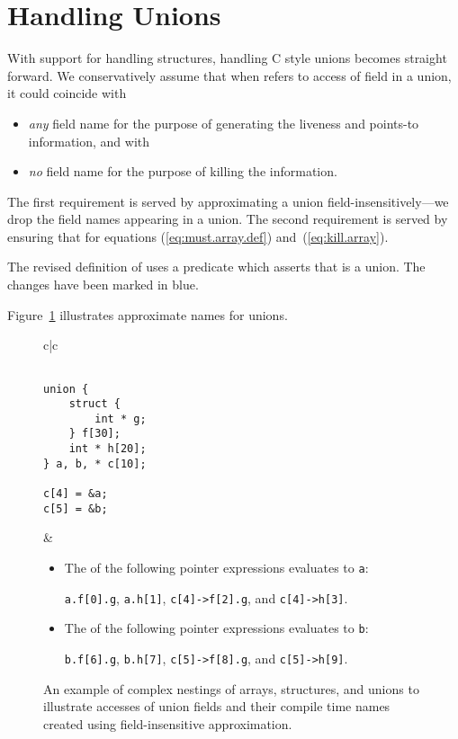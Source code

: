 \documentclass[a4paper,11pt,fleqn]{article}
\begin{document}
\section{Handling Unions}
\label{sec:unions}

With support for handling structures, handling C style unions becomes straight forward.
We conservatively assume that when  refers to access of field  in
a union, it could coincide with 
\begin{itemize}
\item {\em any\/} field name for the purpose of generating the liveness and points-to information, and with
\item {\em no\/} field name for the purpose of killing the information.
\end{itemize}

The first requirement is served by approximating a union field-insensitively---we drop the field names
appearing in a union. 
The second requirement is served by ensuring that \text{}
for equations (\ref{eq:must.array.def}) and~(\ref{eq:kill.array}).

The revised definition of \lval uses a
predicate  which asserts that  is a union. The 
changes have been marked in blue.


Figure~\ref{fig:exmp.union} illustrates approximate names for unions.

\begin{figure}[t]
\begin{center}
\begin{tabular}{c|c}
\begin{minipage}{40mm}
\begin{verbatim}

union {
    struct {
        int * g;
    } f[30];
    int * h[20];
} a, b, * c[10];

c[4] = &a;
c[5] = &b;

\end{verbatim}
\end{minipage}
&
\begin{minipage}{105mm}
\begin{itemize}
\item The \lval of the following pointer expressions evaluates to {\tt a}: 

	{\tt a.f[0].g}, {\tt a.h[1]}, {\tt c[4]->f[2].g}, and {\tt c[4]->h[3]}. 

\item The \lval of the following pointer expressions evaluates to {\tt b}: 

{\tt b.f[6].g}, {\tt b.h[7]}, {\tt c[5]->f[8].g}, and {\tt c[5]->h[9]}.
\end{itemize}
\end{minipage}
\end{tabular}
\end{center}
\caption{An example of complex nestings of arrays, structures, and unions to
illustrate accesses of union fields and their compile time names created using field-insensitive approximation.}
\label{fig:exmp.union}
\end{figure}
\end{document}
